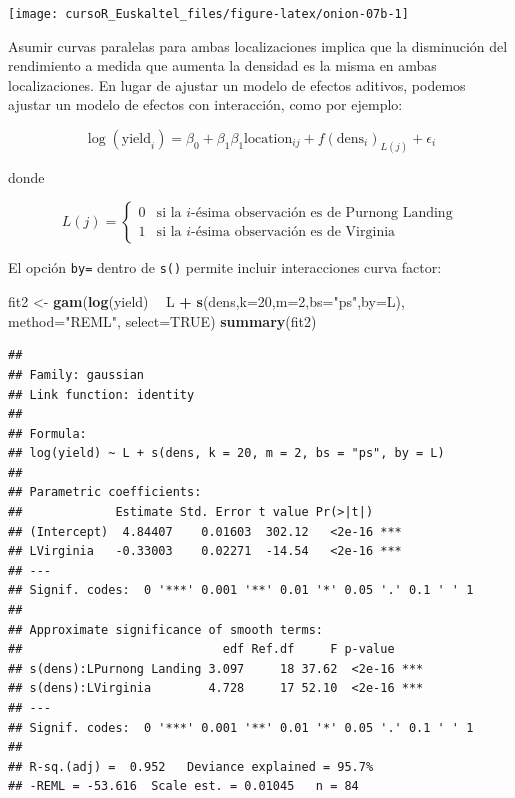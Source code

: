 \documentclass[]{book}
\newenvironment{Shaded}{\begin{snugshade}}{\end{snugshade}}
\newcommand{\KeywordTok}[1]{\textcolor[rgb]{0.13,0.29,0.53}{\textbf{#1}}}
\newcommand{\DataTypeTok}[1]{\textcolor[rgb]{0.13,0.29,0.53}{#1}}
\newcommand{\DecValTok}[1]{\textcolor[rgb]{0.00,0.00,0.81}{#1}}
\newcommand{\StringTok}[1]{\textcolor[rgb]{0.31,0.60,0.02}{#1}}
\newcommand{\OtherTok}[1]{\textcolor[rgb]{0.56,0.35,0.01}{#1}}
\newcommand{\OperatorTok}[1]{\textcolor[rgb]{0.81,0.36,0.00}{\textbf{#1}}}
\newcommand{\NormalTok}[1]{#1}
\begin{document}
\begin{center}\texttt{[image: cursoR\_Euskaltel\_files/figure-latex/onion-07b-1]} \end{center}

Asumir curvas paralelas para ambas localizaciones implica que la
disminución del rendimiento a medida que aumenta la densidad es la misma
en ambas localizaciones. En lugar de ajustar un modelo de efectos
aditivos, podemos ajustar un modelo de efectos con interacción, como por
ejemplo:

\[
\log(\text{yield}_i) =\beta_0 + \beta_1 \beta_1\text{location}_{ij} +  f(\text{dens}_i)_{L(j)} + \epsilon_i
\]

donde

\[
L(j) =
\left\{
\begin{array}{cl}
0 & \mbox{si la $i$-ésima observación es de Purnong Landing} \\
1 & \mbox{si la $i$-ésima observación es de Virginia}
\end{array}
\right.
\]

El opción \texttt{by=} dentro de \texttt{s()} permite incluir
interacciones curva factor:

\begin{Shaded}
\begin{Highlighting}[]
\NormalTok{fit2 <-}\StringTok{ }\KeywordTok{gam}\NormalTok{(}\KeywordTok{log}\NormalTok{(yield) }\OperatorTok{~}\StringTok{ }\NormalTok{L }\OperatorTok{+}\StringTok{ }\KeywordTok{s}\NormalTok{(dens,}\DataTypeTok{k=}\DecValTok{20}\NormalTok{,}\DataTypeTok{m=}\DecValTok{2}\NormalTok{,}\DataTypeTok{bs=}\StringTok{"ps"}\NormalTok{,}\DataTypeTok{by=}\NormalTok{L),}
            \DataTypeTok{method=}\StringTok{"REML"}\NormalTok{, }\DataTypeTok{select=}\OtherTok{TRUE}\NormalTok{)}
\KeywordTok{summary}\NormalTok{(fit2)}
\end{Highlighting}
\end{Shaded}

\begin{verbatim}
## 
## Family: gaussian 
## Link function: identity 
## 
## Formula:
## log(yield) ~ L + s(dens, k = 20, m = 2, bs = "ps", by = L)
## 
## Parametric coefficients:
##             Estimate Std. Error t value Pr(>|t|)    
## (Intercept)  4.84407    0.01603  302.12   <2e-16 ***
## LVirginia   -0.33003    0.02271  -14.54   <2e-16 ***
## ---
## Signif. codes:  0 '***' 0.001 '**' 0.01 '*' 0.05 '.' 0.1 ' ' 1
## 
## Approximate significance of smooth terms:
##                            edf Ref.df     F p-value    
## s(dens):LPurnong Landing 3.097     18 37.62  <2e-16 ***
## s(dens):LVirginia        4.728     17 52.10  <2e-16 ***
## ---
## Signif. codes:  0 '***' 0.001 '**' 0.01 '*' 0.05 '.' 0.1 ' ' 1
## 
## R-sq.(adj) =  0.952   Deviance explained = 95.7%
## -REML = -53.616  Scale est. = 0.01045   n = 84
\end{verbatim}
\end{document}
